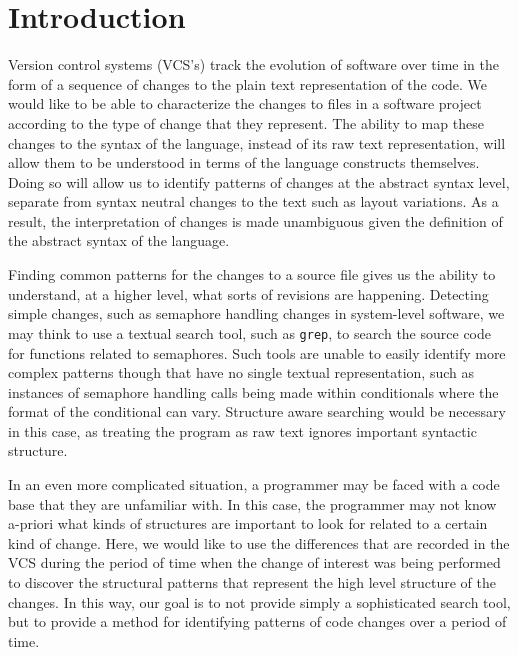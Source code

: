 \section{Introduction}


Version control systems (VCS's) track the evolution of software over time in
the form of a sequence of changes to the plain text representation of the
code. We would like to be able to characterize the changes to files in a
software project according to the type of change that they represent.  The
ability to map these changes to the syntax of the language, instead of its raw
text representation, will allow them to be understood in terms of the language
constructs themselves.  Doing so will allow us to identify patterns of changes
at the abstract syntax level, separate from syntax neutral changes to the text
such as layout variations.  As a result, the interpretation of changes is
made unambiguous given the definition of the abstract syntax of the language.

Finding common patterns for the changes to a source file gives us the ability
to understand, at a higher level, what sorts of revisions are happening.
Detecting simple changes, such as semaphore handling changes in system-level
software, we may think to use a textual search tool, such as {\tt grep}, to
search the source code for functions related to semaphores. Such tools are
unable to easily identify more complex patterns though that have no single
textual representation, such as instances of semaphore handling calls being made
within conditionals where the format of the conditional can vary.  Structure
aware searching would be necessary in this case, as treating the program as
raw text ignores important syntactic structure.

In an even more complicated situation, a programmer may be faced with a
code base that they are unfamiliar with.  In this case, the programmer may not
know a-priori what kinds of structures are important to look for related to
a certain kind of change.  Here, we would like to use the differences that are
recorded in the VCS during the period of time when the change of interest was
being performed to discover the structural patterns that represent the high
level structure of the changes.  In this way, our goal is to not provide simply
a sophisticated search tool, but to provide a method for identifying patterns 
of code changes over a period of time.

